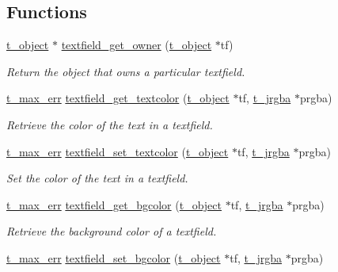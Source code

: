 \subsection*{Functions}
\begin{DoxyCompactItemize}
\item 
\hyperlink{structt__object}{t\_\-object} $\ast$ \hyperlink{group__textfield_ga02adcf0c2ca273b730cdbb0030585f26}{textfield\_\-get\_\-owner} (\hyperlink{structt__object}{t\_\-object} $\ast$tf)
\begin{DoxyCompactList}\small\item\em Return the object that owns a particular textfield. \item\end{DoxyCompactList}\item 
\hyperlink{group__datatypes_ga73edaae82b318855cc09fac994918165}{t\_\-max\_\-err} \hyperlink{group__textfield_ga6bbb44ffcaceb666d01ba9008c898fa9}{textfield\_\-get\_\-textcolor} (\hyperlink{structt__object}{t\_\-object} $\ast$tf, \hyperlink{structt__jrgba}{t\_\-jrgba} $\ast$prgba)
\begin{DoxyCompactList}\small\item\em Retrieve the color of the text in a textfield. \item\end{DoxyCompactList}\item 
\hyperlink{group__datatypes_ga73edaae82b318855cc09fac994918165}{t\_\-max\_\-err} \hyperlink{group__textfield_gaedcc4a931fedcdcc533235c28d540d32}{textfield\_\-set\_\-textcolor} (\hyperlink{structt__object}{t\_\-object} $\ast$tf, \hyperlink{structt__jrgba}{t\_\-jrgba} $\ast$prgba)
\begin{DoxyCompactList}\small\item\em Set the color of the text in a textfield. \item\end{DoxyCompactList}\item 
\hyperlink{group__datatypes_ga73edaae82b318855cc09fac994918165}{t\_\-max\_\-err} \hyperlink{group__textfield_ga98b305f4949a40de1827a75c4b5d9d8a}{textfield\_\-get\_\-bgcolor} (\hyperlink{structt__object}{t\_\-object} $\ast$tf, \hyperlink{structt__jrgba}{t\_\-jrgba} $\ast$prgba)
\begin{DoxyCompactList}\small\item\em Retrieve the background color of a textfield. \item\end{DoxyCompactList}\item 
\hyperlink{group__datatypes_ga73edaae82b318855cc09fac994918165}{t\_\-max\_\-err} \hyperlink{group__textfield_gab015a56be805f8f29812c853f85a6924}{textfield\_\-set\_\-bgcolor} (\hyperlink{structt__object}{t\_\-object} $\ast$tf, \hyperlink{structt__jrgba}{t\_\-jrgba} $\ast$prgba)

\end{DoxyCompactItemize}
